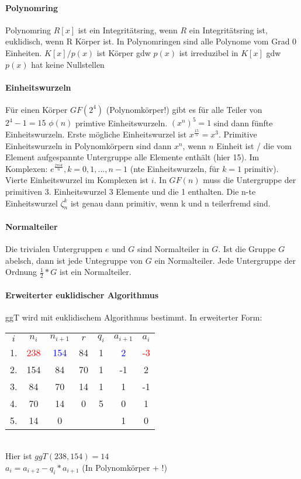 \documentclass[12pt,landscape]{article}
\begin{document}
\begin{multicols}{3}
\paragraph{Polynomring} Polynomring $R[x]$ ist ein Integritätsring, wenn $R$ ein Integritätsring ist, euklidisch, wenn R Körper ist. In Polynomringen sind alle Polynome vom Grad 0 Einheiten. $K[x] / p(x)$ ist Körper gdw $p(x)$ ist irreduzibel in $K[x]$ gdw $p(x)$ hat keine Nullstellen
\paragraph{Einheitswurzeln} Für einen Körper $GF(2^4)$ (Polynomkörper!) gibt es für alle Teiler von $2^4 - 1 = 15$ $\phi(n)$ primtive Einheitswurzeln. $(x^n)^5 = 1$ sind dann fünfte Einheitswurzeln. Erste mögliche Einheitswurzel ist $x^{\frac{15}{5}} = x^3$. Primitive Einheitswurzeln in Polynomkörpern sind dann $x^n$, wenn $n$ Einheit ist / die vom Element aufgespannte Untergruppe alle Elemente enthält (hier 15). Im Komplexen: $e^{\frac{2\pi ik}{n}}, k = 0, 1, ..., n - 1$ (nte Einheitswurzeln, für $k=1$ primitiv). Vierte Einheitswurzel im Komplexen ist $i$. In $GF(n)$ muss die Untergruppe der primitiven 3. Einheitswurzel 3 Elemente und die 1 enthalten. Die n-te Einheitswurzel $\zeta_n^k$ ist genau dann primitiv, wenn k und n teilerfremd sind. 
\paragraph{Normalteiler} Die trivialen Untergruppen ${e}$ und $G$ sind Normalteiler in $G$. Ist die Gruppe $G$ abelsch, dann ist jede Untegruppe von $G$ ein Normalteiler. Jede Untergruppe der Ordnung $\frac{1}{2} * G$ ist ein Normalteiler.
\paragraph{Erweiterter euklidischer Algorithmus}
ggT wird mit euklidischem Algorithmus bestimmt. In erweiterter Form:\\
\begin{tabular}{ccccccc}
	$i$ & $n_i$ & $n_{i+1}$ &  $r$ & $q_i$ & $a_{i+1}$ & $a{_i}$ \\ 
	1. & \textcolor{red}{238} & \textcolor{blue}{154} & 84 & 1 & \textcolor{blue}{2} & \textcolor{red}{-3} \\ 
	2. & 154 &  84 & 70 & 1 & -1 & 2 \\ 
	3. & 84 & 70 & 14 & 1 & 1 & -1 \\ 
	4. & 70 & 14 & 0 & 5 & 0 & 1 \\ 
	5. & 14 & 0 & &  & 1 & 0 \\ 
\end{tabular}\\
Hier ist $ggT(238, 154) = 14$\\
$a_i = a_{i+2} - q_i * a_{i+1}$ (In Polynomkörper + !)\\

\end{multicols}
\end{document}
